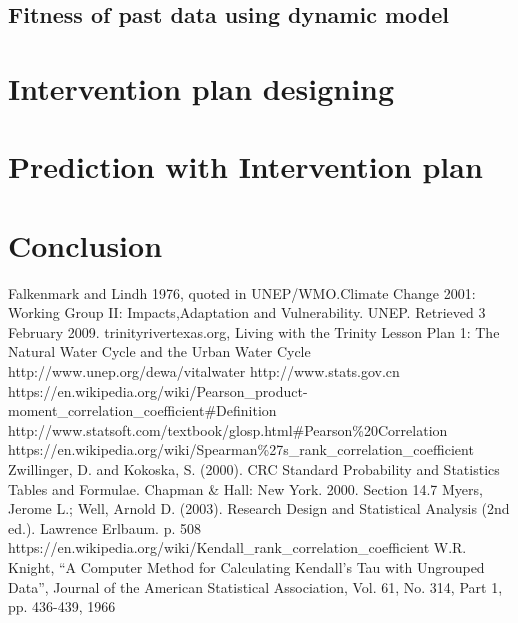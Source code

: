   \subsection{Fitness of past data using dynamic model}




\section{Intervention plan designing}

\section{Prediction with Intervention plan}

\section{Conclusion}


\begin{thebibliography}{99}
   {Falkenmark and Lindh 1976, quoted in UNEP/WMO.Climate Change 2001: Working Group II: Impacts,Adaptation and Vulnerability. UNEP. Retrieved 3 February 2009.}
   trinityrivertexas.org, Living with the Trinity Lesson Plan 1: The Natural Water Cycle and the Urban Water Cycle
   http://www.unep.org/dewa/vitalwater
   http://www.stats.gov.cn
   https://en.wikipedia.org/wiki/Pearson\_product-moment\_correlation\_coefficient\#Definition
   http://www.statsoft.com/textbook/glosp.html\#Pearson\%20Correlation
   https://en.wikipedia.org/wiki/Spearman\%27s\_rank\_correlation\_coefficient
   Zwillinger, D. and Kokoska, S. (2000). CRC Standard Probability and Statistics Tables and Formulae. Chapman \& Hall: New York. 2000. Section 14.7
   Myers, Jerome L.; Well, Arnold D. (2003). Research Design and Statistical Analysis (2nd ed.). Lawrence Erlbaum. p. 508
   https://en.wikipedia.org/wiki/Kendall\_rank\_correlation\_coefficient
   W.R. Knight, “A Computer Method for Calculating Kendall’s Tau with Ungrouped Data”, Journal of the American Statistical Association, Vol. 61, No. 314, Part 1, pp. 436-439, 1966

\end{thebibliography}



